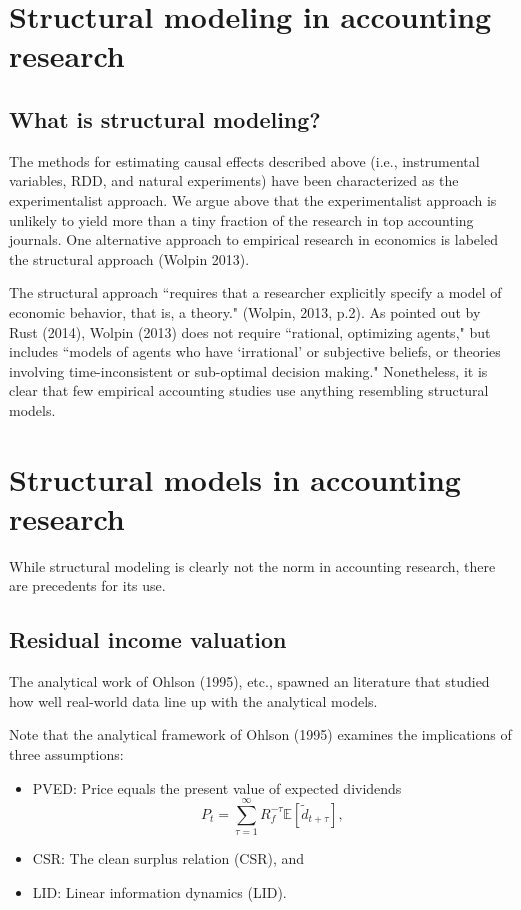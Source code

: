 

\section{Structural modeling in accounting research}

\subsection{What is structural modeling?}
The methods for estimating causal effects described above (i.e., instrumental variables, RDD, and natural experiments) have been characterized as the experimentalist approach. 
We argue above that the experimentalist approach is unlikely to yield more than a tiny fraction of the research in top accounting journals. One alternative approach to empirical research in economics is labeled the structural approach (Wolpin 2013).

The structural approach ``requires that a researcher explicitly specify a model of economic behavior, that is, a theory." (Wolpin, 2013, p.2). As pointed out by Rust (2014), Wolpin (2013) does not require ``rational, optimizing agents," but includes ``models of agents who have `irrational' or subjective beliefs, or theories involving time-inconsistent or sub-optimal decision making." Nonetheless, it is clear that few empirical accounting studies use anything resembling structural models.

\section{Structural models in accounting research}
While structural modeling is clearly not the norm in accounting research, there are precedents for its use.

\subsection{Residual income valuation}
The analytical work of Ohlson (1995), etc., spawned an literature that studied how well real-world data line up with the analytical models.

Note that the analytical framework of Ohlson (1995) examines the implications of three assumptions: 
\begin{itemize}
\item PVED: Price equals the present value of expected dividends
\[ P_t = \sum_{\tau=1}^{\infty} R_f^{-\tau} \mathbb{E} [\tilde{d}_{t+\tau} ], \]
\item CSR: The clean surplus relation (CSR), and
\item LID: Linear information dynamics (LID). 
\end{itemize}

